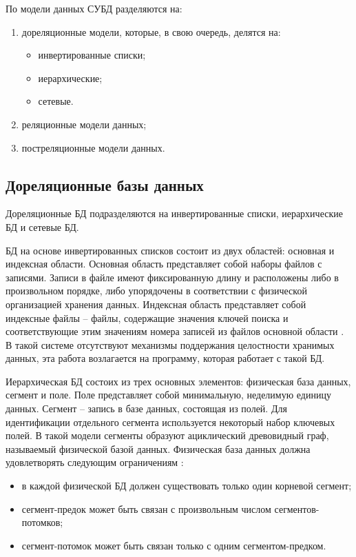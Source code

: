 По модели данных СУБД разделяются на:

\begin{enumerate}[label={\arabic*)}]
	\item дореляционные модели, которые, в свою очередь, делятся на:
	\begin{itemize}[label*=--]
		\item инвертированные списки;
		\item иерархические;
		\item сетевые.
	\end{itemize}
	\item реляционные модели данных;
	\item постреляционные модели данных.
\end{enumerate}

\subsection{Дореляционные базы данных}

Дореляционные БД подразделяются на инвертированные списки, иерархические БД и сетевые БД.

БД на основе инвертированных списков состоит из двух областей: основная и индексная области. Основная область представляет собой наборы файлов с записями. Записи в файле имеют фиксированную длину и расположены либо в произвольном порядке, либо упорядочены в соответствии с физической организацией хранения данных. Индексная область представляет собой индексные файлы -- файлы, содержащие значения ключей поиска и соответствующие этим значениям номера записей из файлов основной области \cite{info_inverted_lists}. В такой системе отсутствуют механизмы поддержания целостности хранимых данных, эта работа возлагается на программу, которая работает с такой БД.

Иерархическая БД состоих из трех основных элементов: физическая база данных, сегмент и поле. Поле представляет собой минимальную, неделимую единицу данных. Сегмент -- запись в базе данных, состоящая из полей. Для идентификации отдельного сегмента используется некоторый набор ключевых полей. В такой модели сегменты образуют ациклический древовидный граф, называемый физической базой данных. Физическая база данных должна удовлетворять следующим ограничениям \cite{info_inverted_lists}: 

\begin{itemize}[label*=--]
	\item в каждой физической БД должен существовать только один корневой сегмент;
	\item сегмент-предок может быть связан с произвольным числом сегментов-потомков;
	\item сегмент-потомок может быть связан только с одним сегментом-предком.
\end{itemize}

